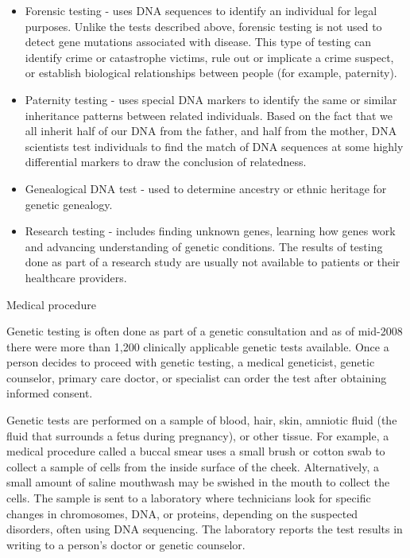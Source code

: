 \begin{itemize}
\tightlist
\item
  Forensic testing - uses DNA sequences to identify an individual for legal purposes. Unlike the tests described above, forensic testing is not used to detect gene mutations associated with disease. This type of testing can identify crime or catastrophe victims, rule out or implicate a crime suspect, or establish biological relationships between people (for example, paternity).
\item
  Paternity testing - uses special DNA markers to identify the same or similar inheritance patterns between related individuals. Based on the fact that we all inherit half of our DNA from the father, and half from the mother, DNA scientists test individuals to find the match of DNA sequences at some highly differential markers to draw the conclusion of relatedness.
\item
  Genealogical DNA test - used to determine ancestry or ethnic heritage for genetic genealogy.
\item
  Research testing - includes finding unknown genes, learning how genes work and advancing understanding of genetic conditions. The results of testing done as part of a research study are usually not available to patients or their healthcare providers.
\end{itemize}

Medical procedure

Genetic testing is often done as part of a genetic consultation and as of mid-2008 there were more than 1,200 clinically applicable genetic tests available. Once a person decides to proceed with genetic testing, a medical geneticist, genetic counselor, primary care doctor, or specialist can order the test after obtaining informed consent.

Genetic tests are performed on a sample of blood, hair, skin, amniotic fluid (the fluid that surrounds a fetus during pregnancy), or other tissue. For example, a medical procedure called a buccal smear uses a small brush or cotton swab to collect a sample of cells from the inside surface of the cheek. Alternatively, a small amount of saline mouthwash may be swished in the mouth to collect the cells. The sample is sent to a laboratory where technicians look for specific changes in chromosomes, DNA, or proteins, depending on the suspected disorders, often using DNA sequencing. The laboratory reports the test results in writing to a person's doctor or genetic counselor.

